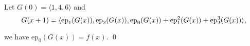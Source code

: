 
\begin{pf} \rm
  Let $G(0) = \langle 1, 4, 6\rangle$ and
\[
 G(x + 1) = \langle
   \mathrm{ep}_1(G(x)),
   \mathrm{ep}_2(G(x)),
   \mathrm{ep}_0( G(x) ) + \mathrm{ep}_1^2(G(x)) + \mathrm{ep}_2^3(G(x))
 \rangle,
\]

\noindent we have $\mathrm{ep}_0(G(x)) = f(x)$. \qed
\end{pf}

